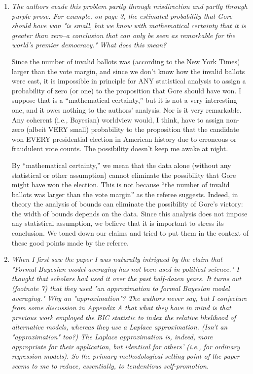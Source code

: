 \documentclass[11pt]{article}
\begin{document}
\begin{enumerate}
\item {\it The authors evade this problem partly through misdirection
    and partly through purple prose.  For example, on page 3, the
    estimated probability that Gore should have won "is small, but we
    know with mathematical certainty that it is greater than zero--a
    conclusion that can only be seen as remarkable for the world's
    premier democracy."  What does this mean?
    
    Since the number of invalid ballots was (according to the New York
    Times) larger than the vote margin, and since we don't know how
    the invalid ballots were cast, it is impossible in principle for
    ANY statistical analysis to assign a probability of zero (or one)
    to the proposition that Gore should have won.  I suppose that is a
    ``mathematical certainty,'' but it is not a very interesting one,
    and it owes nothing to the authors' analysis.  Nor is it very
    remarkable.  Any coherent (i.e., Bayesian) worldview would, I
    think, have to assign non-zero (albeit VERY small) probability to
    the proposition that the candidate won EVERY presidential election
    in American history due to erroneous or fraudulent vote counts.
    The possibility doesn't keep me awake at night.}
  
  By ``mathematical certainty,'' we mean that the data alone (without
  any statistical or other assumption) cannot eliminate the
  possibility that Gore might have won the election. This is not
  because ``the number of invalid ballots was larger than the vote
  margin'' as the referee suggests.  Indeed, in theory the analysis of
  bounds can eliminate the possibility of Gore's victory: the width of
  bounds depends on the data. Since this analysis does not impose any
  statistical assumption, we believe that it is important to stress
  its conclusion.  We toned down our claims and tried to put them in
  the context of these good points made by the referee.
  
\item {\it When I first saw the paper I was naturally intrigued by the
    claim that "Formal Bayesian model averaging has not been used in
    political science."  I thought that scholars had used it over the
    past half-dozen years.  It turns out (footnote 7) that they used
    "an approximation to formal Bayesian model averaging."  Why an
    "approximation"?  The authors never say, but I conjecture from
    some discussion in Appendix A that what they have in mind is that
    previous work employed the BIC statistic to index the relative
    likelihood of alternative models, whereas they use a Laplace
    approximation.  (Isn't an "approximation" too?)  The Laplace
    approximation is, indeed, more appropriate for their application,
    but identical for others' (i.e., for ordinary regression models).
    So the primary methodological selling point of the paper seems to
    me to reduce, essentially, to tendentious self-promotion.}
  

\end{enumerate}
\end{document}

